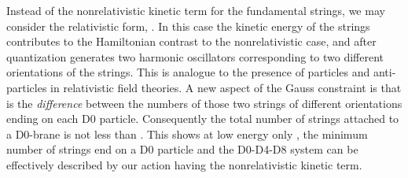 \documentclass[a4paper,12pt]{article}
\begin{document}
Instead of the nonrelativistic kinetic term for the fundamental strings, we may consider the relativistic form,
\coordHE{}. In this case the kinetic energy of the strings contributes to the Hamiltonian
contrast to the nonrelativistic case, and after quantization \myHighlight{$\psi$}\coordHE{} generates two harmonic oscillators
corresponding to two different orientations of the  strings. This is analogue to the presence of  particles and
anti-particles  in relativistic field theories. A new aspect of the Gauss constraint is that  \myHighlight{$\kappa$}\coordHE{} is the
\textit{difference} between the numbers of  those two strings of different orientations ending on each D0
particle. Consequently  the total number of strings attached to a D0-brane is not less than \myHighlight{$\kappa$}\coordHE{}. This shows
at low energy only \myHighlight{$\kappa$}\coordHE{}, the minimum number of strings  end on a D0 particle and the D0-D4-D8 system can be
effectively described by  our action having the nonrelativistic kinetic term.\newline
\end{document}
